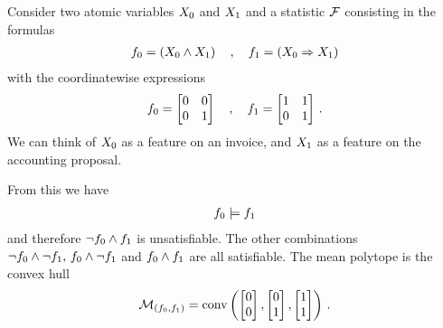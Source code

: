 \begin{example}

    Consider two atomic variables $X_{0}$ and $X_{1}$ and a statistic $\mathcal{F}$ consisting in the formulas
    \begin{align*}
        f_{0} = \left( X_{0} \land X_{1} \right) \quad, \quad f_{1} = \left( X_{0} \Rightarrow X_{1} \right)
    \end{align*}
    with the coordinatewise expressions
    \begin{align*}
        f_{0} =
        \begin{bmatrix}
            0 & 0 \\
            0 & 1
        \end{bmatrix}
        \quad, \quad
        f_{1} =
        \begin{bmatrix}
            1 & 1 \\
            0 & 1
        \end{bmatrix} \, .
    \end{align*}
    We can think of $X_{0}$ as a feature on an invoice, and $X_{1}$ as a feature on the accounting proposal.

    From this we have
    \begin{align*}
        f_{0} \models f_{1}
    \end{align*}
    and therefore $\lnot f_{0}\land f_{1}$ is unsatisfiable.
    The other combinations $\lnot f_{0}\land\lnot f_{1}, \, f_{0}\land\lnot f_{1}$ and $f_{0}\land f_{1}$ are all satisfiable.
    The mean polytope is the convex hull
    \begin{align*}
        \mathcal{M}_{(f_{0},f_{1})} =
        \mathrm{conv}\left(\begin{bmatrix}
                        0 \\ 0
        \end{bmatrix},
            \begin{bmatrix}
                0 \\ 1
            \end{bmatrix},
            \begin{bmatrix}
                1 \\ 1
            \end{bmatrix}\right) \, .
    \end{align*}


\end{example}
